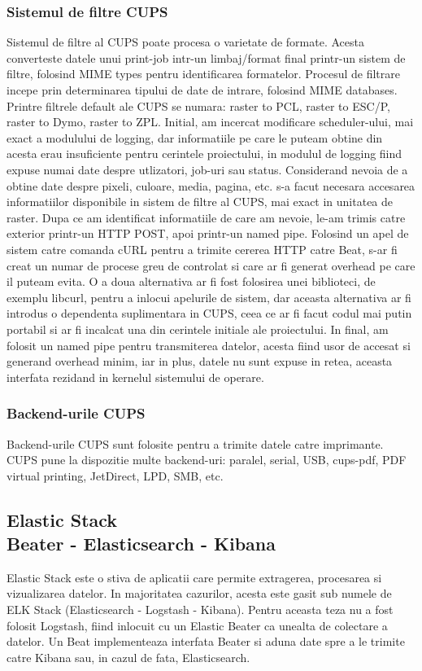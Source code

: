 \documentclass[12pt]{report}
\begin{document}
			\subsubsection{Sistemul de filtre CUPS}
Sistemul de filtre al CUPS poate procesa o varietate de formate. Acesta converteste datele unui print-job intr-un limbaj/format final printr-un sistem de filtre, folosind MIME types pentru identificarea formatelor.
Procesul de filtrare incepe prin determinarea tipului de date de intrare, folosind MIME databases. Printre filtrele default ale CUPS se numara: raster to PCL, raster to ESC/P, raster to Dymo, raster to ZPL.
Initial, am incercat modificare scheduler-ului, mai exact a modulului de logging, dar informatiile pe care le puteam obtine din acesta erau insuficiente pentru cerintele proiectului, in modulul de logging fiind expuse numai date despre utlizatori, job-uri sau status. Considerand nevoia de a obtine date despre pixeli, culoare, media, pagina, etc. s-a facut necesara accesarea informatiilor disponibile in sistem de filtre al CUPS, mai exact in unitatea de raster. Dupa ce am identificat informatiile de care am nevoie, le-am trimis catre exterior printr-un HTTP POST, apoi printr-un named pipe. Folosind un apel de sistem catre comanda cURL pentru a trimite cererea HTTP catre Beat, s-ar fi creat un numar de procese greu de controlat si care ar fi generat overhead pe care il puteam evita. O a doua alternativa ar fi fost folosirea unei biblioteci, de exemplu libcurl, pentru a inlocui apelurile de sistem, dar aceasta alternativa ar fi introdus o dependenta suplimentara in CUPS, ceea ce ar fi facut codul mai putin portabil si ar fi incalcat una din cerintele initiale ale proiectului. In final, am folosit un named pipe pentru transmiterea datelor, acesta fiind usor de accesat si generand overhead minim, iar in plus, datele nu sunt expuse in retea, aceasta interfata rezidand in kernelul sistemului de operare.


			\subsubsection{Backend-urile CUPS}
Backend-urile CUPS sunt folosite pentru a trimite datele catre imprimante. CUPS pune la dispozitie multe backend-uri: paralel, serial, USB, cups-pdf, PDF virtual printing, JetDirect, LPD, SMB, etc.
		
		
		\subsection[Elastic Stack]{Elastic Stack\\ {\normalsize Beater - Elasticsearch - Kibana}}
Elastic Stack este o stiva de aplicatii care permite extragerea, procesarea si vizualizarea datelor. In majoritatea cazurilor, acesta este gasit sub numele de ELK Stack (Elasticsearch - Logstash - Kibana). Pentru aceasta teza nu a fost folosit Logstash, fiind inlocuit cu un Elastic Beater ca unealta de colectare a datelor. Un Beat implementeaza interfata Beater si aduna date spre a le trimite catre Kibana sau, in cazul de fata, Elasticsearch.
\end{document}
